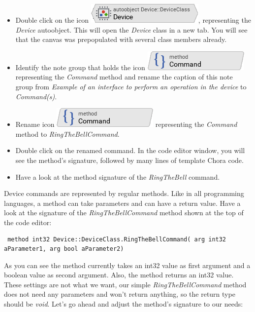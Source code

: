 \documentclass[
  a4paper,
,tablecaptionabove
]{scrbook}
\begin{document}
\begin{itemize}
\item
  Double click on the icon
  \includegraphics{./../asciidoc/modules/ROOT/assets/images/icons/DeviceAutoObjectIcon.png},
  representing the \emph{Device} autoobject. This will open the
  \emph{Device} class in a new tab. You will see that the canvas was
  prepopulated with several class members already.
\item
  Identify the note group that holds the icon
  \includegraphics{./../asciidoc/modules/ROOT/assets/images/icons/CommandMethodIcon.png}
  representing the \emph{Command} method and rename the caption of this
  note group from \emph{Example of an interface to perform an operation
  in the device} to \emph{Command(s)}.
\item
  Rename icon
  \includegraphics{./../asciidoc/modules/ROOT/assets/images/icons/CommandMethodIcon.png}
  representing the \emph{Command} method to \emph{RingTheBellCommand}.
\item
  Double click on the renamed command. In the code editor window, you
  will see the method's signature, followed by many lines of template
  Chora code.
\item
  Have a look at the method signature of the \emph{RingTheBell} command.
\end{itemize}

Device commands are represented by regular methods. Like in all
programming languages, a method can take parameters and can have a
return value. Have a look at the signature of the
\emph{RingTheBellCommand} method shown at the top of the code editor:

\begin{verbatim}
 method int32 Device::DeviceClass.RingTheBellCommand( arg int32 aParameter1, arg bool aParameter2)
\end{verbatim}

As you can see the method currently takes an int32 value as first
argument and a boolean value as second argument. Also, the method
returns an int32 value. These settings are not what we want, our simple
\emph{RingTheBellCommand} method does not need any parameters and won't
return anything, so the return type should be \emph{void}. Let's go
ahead and adjust the method's signature to our needs:
\end{document}
